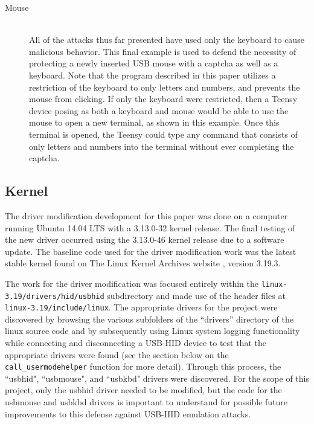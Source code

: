 \documentclass[pagenumbers]{ieee}
\begin{document}
\begin{description}
\item[Mouse] \hfill \\
All of the attacks thus far presented have used only the keyboard to cause malicious behavior. This final example is used to defend the necessity of protecting a newly inserted USB mouse with a captcha as well as a keyboard. Note that the program described in this paper utilizes a restriction of the keyboard to only letters and numbers, and prevents the mouse from clicking.  If only the keyboard were restricted, then a Teensy device posing as both a keyboard and mouse would be able to use the mouse to open a new terminal, as shown in this example. Once this terminal is opened, the Teensy could type any command that consists of only letters and numbers into the terminal without ever completing the captcha.
\end{description}


\subsection{Kernel}
\label{section:kernel}

The driver modification development for this paper was done on a computer running Ubuntu 14.04 LTS with a 3.13.0-32 kernel release. The final testing of the new driver occurred using the 3.13.0-46 kernel release due to a software update. The baseline code used for the driver modification work was the latest stable kernel found on The Linux Kernel Archives website \cite{kernel}, version 3.19.3. 

The work for the driver modification was focused entirely within the \texttt{linux-3.19/drivers/hid/usbhid} subdirectory and made use of the header files at \texttt{linux-3.19/include/linux}. The appropriate drivers for the project were discovered by browsing the various subfolders of the ``drivers'' directory of the linux source code and by subsequently using Linux system logging functionality while connecting and disconnecting a USB-HID device to test that the appropriate drivers were found (see the section below on the \texttt{call\_usermodehelper} function for more detail). Through this process, the ``usbhid", ``usbmouse", and ``usbkbd" drivers were discovered. For the scope of this project, only the usbhid driver needed to be modified, but the code for the usbmouse and usbkbd drivers is important to understand for possible future improvements to this defense against USB-HID emulation attacks.
\end{document}
